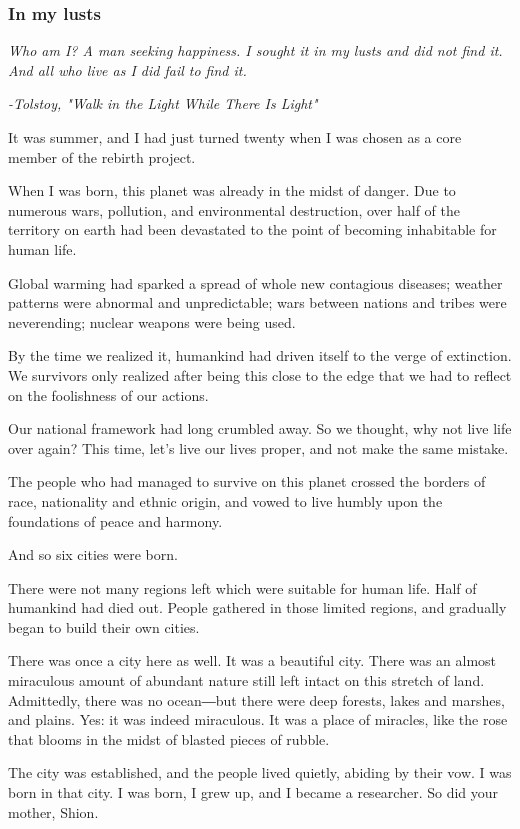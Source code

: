 \subsubsection{In my lusts}

\emph{Who am I? A man seeking happiness. I sought it in my lusts and did
not find it. And all who live as I did fail to find it.}

\emph{-Tolstoy, "Walk in the Light While There Is Light"~}

It was summer, and I had just turned twenty when I was chosen as a core
member of the rebirth project.

When I was born, this planet was already in the midst of danger. Due to
numerous wars, pollution, and environmental destruction, over half of
the territory on earth had been devastated to the point of becoming
inhabitable for human life.

Global warming had sparked a spread of whole new contagious diseases;
weather patterns were abnormal and unpredictable; wars between nations
and tribes were neverending; nuclear weapons were being used.

By the time we realized it, humankind had driven itself to the verge of
extinction. We survivors only realized after being this close to the
edge that we had to reflect on the foolishness of our actions.

Our national framework had long crumbled away. So we thought, why not
live life over again? This time, let's live our lives proper, and not
make the same mistake.

The people who had managed to survive on this planet crossed the borders
of race, nationality and ethnic origin, and vowed to live humbly upon
the foundations of peace and harmony.

And so six cities were born.

There were not many regions left which were suitable for human life.
Half of humankind had died out. People gathered in those limited
regions, and gradually began to build their own cities.

There was once a city here as well. It was a beautiful city. There was
an almost miraculous amount of abundant nature still left intact on this
stretch of land. Admittedly, there was no ocean―but there were deep
forests, lakes and marshes, and plains. Yes: it was indeed miraculous.
It was a place of miracles, like the rose that blooms in the midst of
blasted pieces of rubble.

The city was established, and the people lived quietly, abiding by their
vow. I was born in that city. I was born, I grew up, and I became a
researcher. So did your mother, Shion.

